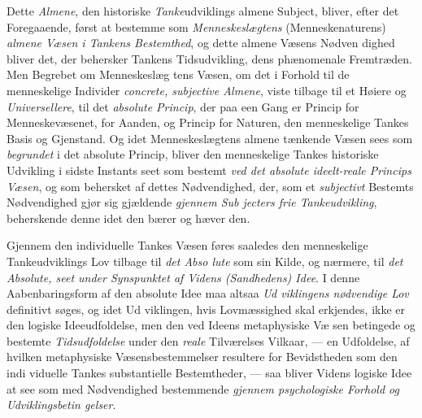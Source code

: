 Dette \emph{Almene}, den historiske \emph{Tanke}udviklings almene
Subject, bliver, efter det Foregaaende, først at bestemme som
\emph{Menneskeslægtens} (Menneskenaturens) \emph{almene Væsen i
Tankens Bestemthed}, og dette almene Væsens Nødven\-%
dighed bliver det, der behersker Tankens Tidsudvikling, dens
phænomenale Fremtræden. Men Begrebet om Menneskeslæg\-%
tens Væsen, om det i Forhold til de menneskelige Individer
\emph{concrete, subjective Almene}, viste tilbage til et Høiere
og \emph{Universellere}, til det \emph{absolute Princip}, der paa een
Gang er Princip for Menneskevæsenet, for Aanden, og Princip
for Naturen, den menneskelige Tankes Basis og Gjenstand.
Og idet Menneskeslægtens almene tænkende Væsen sees som
\emph{begrundet} i det absolute Princip, bliver den menneskelige
Tankes historiske Udvikling i sidste Instants seet som bestemt
\emph{ved det absolute ideelt-reale Princips Væsen}, og
som behersket af dettes Nødvendighed, der, som et \emph{subjectivt}
Bestemts Nødvendighed gjør sig gjældende \emph{gjennem Sub\-%
jecters frie Tankeudvikling}, beherskende denne idet den
bærer og hæver den.

Gjennem den individuelle Tankes Væsen føres saaledes
den menneskelige Tankeudviklings Lov tilbage til \emph{det Abso\-%
lute} som sin Kilde, og nærmere, til \emph{det Absolute, seet
under Synspunktet af Videns (Sandhedens) Idee}. I
denne Aabenbaringsform af den absolute Idee maa altsaa \emph{Ud\-%
viklingens nødvendige Lov} definitivt søges, og idet Ud\-%
viklingen, hvis Lovmæssighed skal erkjendes, ikke er den
logiske Ideeudfoldelse, men den ved Ideens metaphysiske Væ\-%
sen betingede og bestemte \emph{Tidsudfoldelse} under den \emph{reale}
Tilværelses Vilkaar, --- en Udfoldelse, af hvilken metaphysiske
Væsensbestemmelser resultere for Bevidstheden som den indi\-%
viduelle Tankes substantielle Bestemtheder, --- saa bliver Videns
logiske Idee at see som med Nødvendighed bestemmende
\emph{gjennem psychologiske Forhold og Udviklingsbetin\-%
gelser}.

